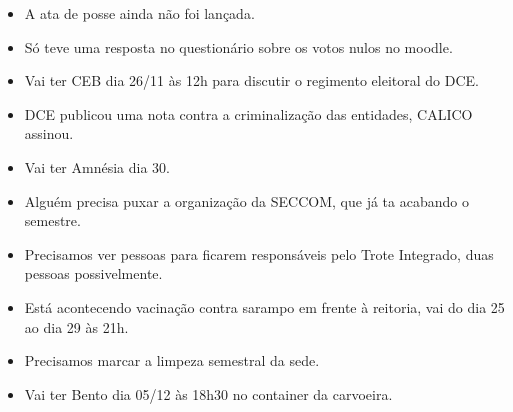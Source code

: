 \documentclass{ata-calico}
\begin{document}
\maketitle

\begin{itemize}
\item A ata de posse ainda não foi lançada.
\item Só teve uma resposta no questionário sobre os votos nulos no moodle.
\item Vai ter CEB dia 26/11 às 12h para discutir o regimento eleitoral do DCE.
\item DCE publicou uma nota contra a criminalização das entidades, CALICO assinou.
\item Vai ter Amnésia dia 30.
\item Alguém precisa puxar a organização da SECCOM, que já ta acabando o semestre.
\item Precisamos ver pessoas para ficarem responsáveis pelo Trote Integrado, duas pessoas possivelmente.
\item Está acontecendo vacinação contra sarampo em frente à reitoria, vai do dia 25 ao dia 29 às 21h.
\item Precisamos marcar a limpeza semestral da sede.
\item Vai ter Bento dia 05/12 às 18h30 no container da carvoeira.
\end{itemize}
\end{document}
